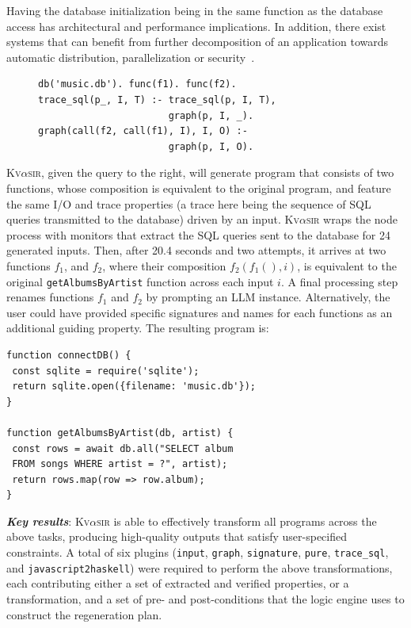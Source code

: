 \documentclass[nonacm,sigplan,review]{acmart}
\newcommand{\sys}{{\scshape Kv{$\alpha$}sir}\xspace}
\newcommand{\heading}[1]{\vspace{2pt}\noindent\textbf{\emph{#1}}:\enspace}
\newcommand{\ttt}[1]{\texttt{#1}\xspace}
\begin{document}
Having the database initialization being in the same function as 
the database access has architectural and performance implications.
In addition, there exist systems that can benefit from further decomposition
of an application towards automatic distribution, parallelization or security~\cite{Towards_Modern_Ghemaw_2023, vasilakis2019ignis, vasilakis2018breakapp}.
\begin{figure}
  \begin{verbatim}
db('music.db'). func(f1). func(f2).
trace_sql(p_, I, T) :- trace_sql(p, I, T),
                       graph(p, I, _).
graph(call(f2, call(f1), I), I, O) :-
                       graph(p, I, O).
\end{verbatim}
\end{figure}
\sys, given the query to the right, will 
generate program that consists of two functions,
whose composition is equivalent to the original program, and feature 
the same I/O and trace properties (a trace here being the sequence of SQL 
queries transmitted to the database) driven by an input.
\sys wraps the node process with monitors that extract the SQL queries 
sent to the database for 24 generated inputs.
Then, after 20.4 seconds and two attempts, it arrives at two functions $f_1$, and 
$f_2$, where their composition $f_2(f_1(), i)$,
is equivalent to the original \ttt{getAlbumsByArtist} function across each input $i$.
A final processing step renames functions $f_1$ and $f_2$ by prompting an LLM instance.
Alternatively, the user could have provided specific signatures and names for each 
functions as an additional guiding property.
The resulting program is:
\begin{verbatim}
function connectDB() {
 const sqlite = require('sqlite');
 return sqlite.open({filename: 'music.db'});
}

function getAlbumsByArtist(db, artist) {
 const rows = await db.all("SELECT album
 FROM songs WHERE artist = ?", artist);
 return rows.map(row => row.album); 
}
\end{verbatim}

\heading{Key results}
\sys is able to effectively transform all programs across the above tasks,
producing high-quality outputs that satisfy user-specified constraints.
A total
of six plugins (\ttt{input}, \ttt{graph}, \ttt{signature}, \ttt{pure}, \ttt{trace\_sql}, and \ttt{javascript2haskell})
were required to perform the above transformations, each
contributing either a set of extracted and verified properties, or a
transformation, and a set of pre- and post-conditions that the logic engine
uses to construct the regeneration plan.
\end{document}

